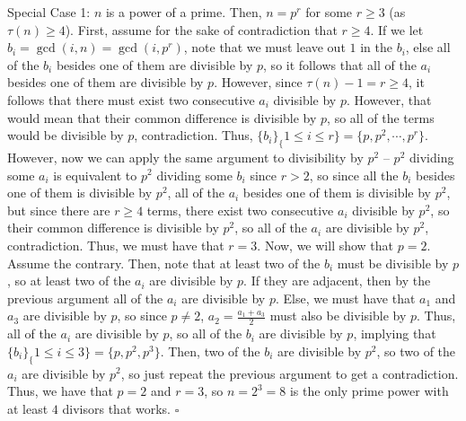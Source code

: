 \documentclass[a4paper]{article}
\begin{document}
\begin{question}[c]{}
{Special Case 1: $n$ is a power of a prime.
Then, $n = p^r$ for some $r\geq 3$ (as $\tau(n) \geq 4$). First, assume for the sake of contradiction that $r\geq 4$. If we let $b_i = \gcd(i, n) = \gcd(i, p^r)$, note that we must leave out $1$ in the $b_i$, else all of the $b_i$ besides one of them are divisible by $p$, so it follows that all of the $a_i$ besides one of them are divisible by $p$. However, since $\tau(n)-1 = r \geq 4$, it follows that there must exist two consecutive $a_i$ divisible by $p$. However, that would mean that their common difference is divisible by $p$, so all of the terms would be divisible by $p$, contradiction. Thus, $\{b_i\}_\{1\leq i\leq r\} = \{p, p^2, \cdots, p^r\}$. However, now we can apply the same argument to divisibility by $p^2$ -- $p^2$ dividing some $a_i$ is equivalent to $p^2$ dividing some $b_i$ since $r > 2$, so since all the $b_i$ besides one of them is divisible by $p^2$, all of the $a_i$ besides one of them is divisible by $p^2$, but since there are $r\geq 4$ terms, there exist two consecutive $a_i$ divisible by $p^2$, so their common difference is divisible by $p^2$, so all of the $a_i$ are divisible by $p^2$, contradiction. Thus, we must have that $r = 3$. Now, we will show that $p = 2$. Assume the contrary. Then, note that at least two of the $b_i$ must be divisible by $p$, so at least two of the $a_i$ are divisible by $p$. If they are adjacent, then by the previous argument all of the $a_i$ are divisible by $p$. Else, we must have that $a_1$ and $a_3$ are divisible by $p$, so since $p\neq 2$, $a_2 = \frac{a_1+a_3}{2}$ must also be divisible by $p$. Thus, all of the $a_i$ are divisible by $p$, so all of the $b_i$ are divisible by $p$, implying that $\{b_i\}_\{1\leq i\leq 3\} = \{p, p^2, p^3\}$. Then, two of the $b_i$ are divisible by $p^2$, so two of the $a_i$ are divisible by $p^2$, so just repeat the previous argument to get a contradiction. Thus, we have that $p = 2$ and $r = 3$, so $n = 2^3 = 8$ is the only prime power with at least $4$ divisors that works. $\square$

}
\end{question}
\end{document}
